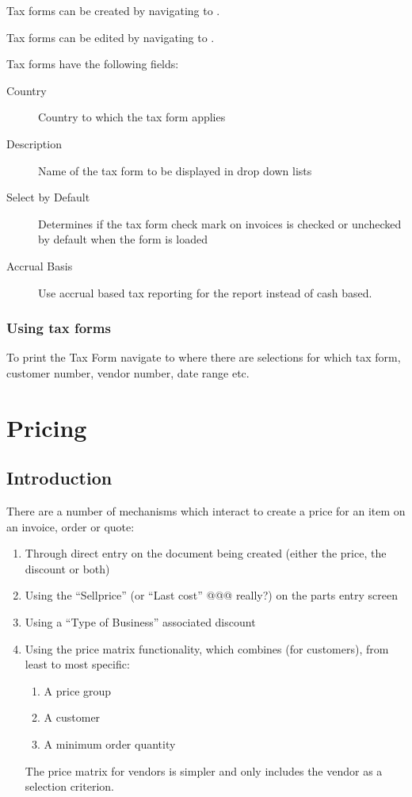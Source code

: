 Tax forms can be created by navigating to .

Tax forms can be edited by navigating to .

Tax forms have the following fields:
\begin{description}
\item [Country] Country to which the tax form applies
\item [Description] Name of the tax form to be displayed in drop down lists
\item [Select by Default] Determines if the tax form check mark on invoices is checked or unchecked by default when the form is loaded
\item [Accrual Basis] Use accrual based tax reporting for the report instead of cash based.
\end{description}

\subsection{Using tax forms}
\label{subsec-tax-taxforms-using}

To print the Tax Form navigate to  where there are selections for which tax form, customer number, vendor number, date range etc.

\chapter{Pricing}
\label{cha-pricing}

\section{Introduction}
\label{sec-pricing-introduction}

There are a number of mechanisms which interact to create a price for an item
on an invoice, order or quote:

\begin{enumerate}
	\item Through direct entry on the document being created (either the price, the discount or both)
	\item Using the ``Sellprice'' (or ``Last cost'' @@@ really?) on the parts entry screen
	\item Using a ``Type of Business'' associated discount
	\item Using the price matrix functionality, which combines (for customers), from least to most specific:
		\begin{enumerate}
			\item A price group
			\item A customer
			\item A minimum order quantity
		\end{enumerate}
		The price matrix for vendors is simpler and only includes the vendor as a selection criterion.
\end{enumerate}

